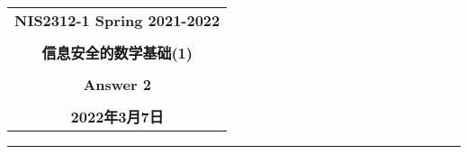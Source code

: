 \documentclass[a4paper,12pt]{ctexart}
\begin{document}
  \begin{center}

  \vspace{-0.3in}
  \begin{tabular}{c}
    \textbf{\Large NIS2312-1 Spring 2021-2022} \\
    \textbf{\Large  } \\
    \textbf{\Large  信息安全的数学基础(1)} \\
    \textbf{\Large  } \\
    \textbf{\Large  Answer 2 } \\
    \textbf{\Large  } \\
    \textbf{\Large 2022年3月7日} \\
  \end{tabular}
  \end{center}
  \noindent
  \rule{\linewidth}{0.4pt}
\end{document}
